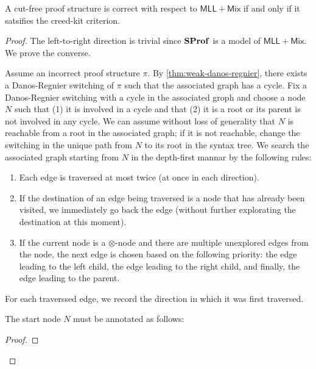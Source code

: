 \begin{theorem}\label{thm:creed-kit-correctness-without-cut}
    A cut-free proof structure is correct with respect to \( \mathsf{MLL+Mix} \) if and only if it satsifies the creed-kit criterion.
\end{theorem}
\begin{proof}
    The left-to-right direction is trivial since \( \mathbf{SProf} \) is a model of \( \mathsf{MLL+Mix} \).
    We prove the converse.

    Assume an incorrect proof structure \( \pi \).
    By \cref{thm:weak-danos-regnier}, there exists a Danos-Regnier switching of \( \pi \) such that the associated graph has a cycle.
    Fix a Danos-Regnier switching with a cycle in the associated groph and choose a node \( N \) such that (1) it is involved in a cycle and that (2) it is a root or its parent is not involved in any cycle.
    We can assume without loss of generality that \( N \) is reachable from a root in the associated graph; if it is not reachable, change the switching in the unique path from \( N \) to its root in the syntax tree.
    We search the associated graph starting from \( N \) in the depth-first mannar by the following rules:
    \begin{enumerate}
        \item 
        Each edge is traversed at most twice (at once in each direction).
        \item
        If the destination of an edge being traversed is a node that has already been visited, we immediately go back the edge (without further explorating the destination at this moment).
        \item
        If the current node is a \( \otimes \)-node and there are multiple unexplored edges from the node, the next edge is chosen based on the following priority: the edge leading to the left child, the edge leading to the right child, and finally, the edge leading to the parent.
    \end{enumerate}
    For each traverssed edge, we record the direction in which it was first traversed.

    \begin{claim*}
        The start node \( N \) must be annotated as follows: 
    \end{claim*}
    \begin{proof}
    \end{proof}
\end{proof}




